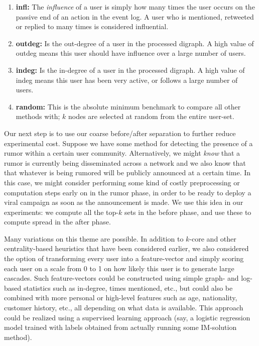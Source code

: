 \documentclass[sigconf]{acmart}
\begin{document}
\begin{enumerate}
\item \textbf{infl: } The \emph{influence} of a user is simply how many times the user occurs on the passive end of an action in the event log. A user who is mentioned, retweeted or replied to many times is considered influential. 
\item \textbf{outdeg: } Is the out-degree of a user in the processed digraph. A high value of outdeg means this user should have influence over a large number of users.
\item \textbf{indeg: } Is the in-degree of a user in the processed digraph. A high value of indeg means this user has been very active, or follows a large number of users. 
\item \textbf{random: } This is the absolute minimum benchmark to compare all other methods with; $k$ nodes are selected at random from the entire user-set. 
\end{enumerate}

Our next step is to use our coarse before/after separation to further reduce experimental cost. Suppose we have some method for detecting the presence of a rumor within a certain user community. Alternatively, we might \emph{know} that a rumor is currently being disseminated across a network and we also know that that whatever is being rumored will be publicly announced at a certain time. In this case, we might consider performing some kind of costly preprocessing or computation steps early on in the rumor phase, in order to be ready to deploy a viral campaign as soon as the announcement is made. We use this idea in our experiments: we compute all the top-$k$ sets in the before phase, and use these to compute spread in the after phase. 

Many variations on this theme are possible. In addition to $k$-core and other centrality-based heuristics that have been considered earlier, we also considered the option of transforming every user into a feature-vector and simply scoring each user on a scale from 0 to 1 on how likely this user is to generate large cascades. Such feature-vectors could be constructed using simple graph- and log-based statistics such as in-degree, times mentioned, etc., but could also be combined with more personal or high-level features such as age, nationality, customer history, etc., all depending on what data is available. This approach could be realized using a supervised learning approach (say, a logistic regression model trained with labels obtained from actually running some IM-solution method).
\end{document}
